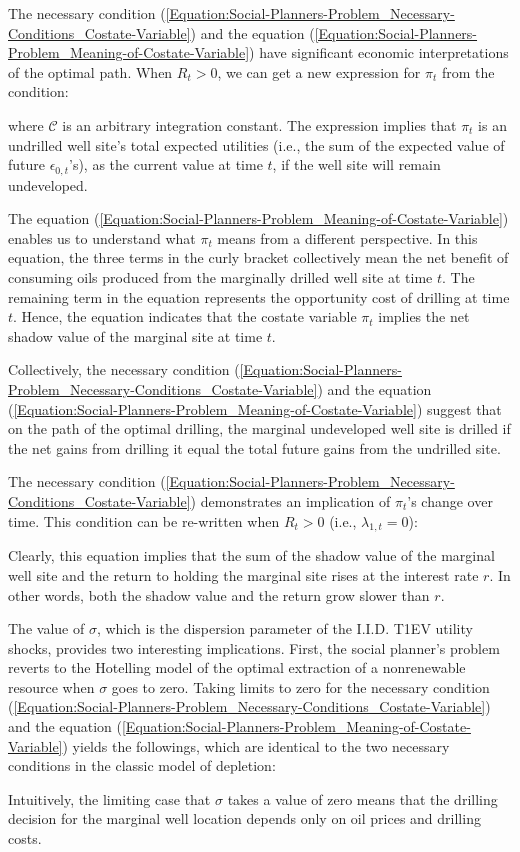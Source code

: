 The necessary condition (\ref{Equation:Social-Planners-Problem_Necessary-Conditions_Costate-Variable}) and the equation (\ref{Equation:Social-Planners-Problem_Meaning-of-Costate-Variable}) have significant economic interpretations of the optimal path. When $R_{t} > 0$, we can get a new expression for $\pi_{t}$ from the condition:

where $\mathcal{C}$ is an arbitrary integration constant. The expression implies that $\pi_{t}$ is an undrilled well site's total expected utilities (i.e., the sum of the expected value of future $\epsilon_{0, t}$'s), as the current value at time $t$, if the well site will remain undeveloped. 

The equation (\ref{Equation:Social-Planners-Problem_Meaning-of-Costate-Variable}) enables us to understand what $\pi_{t}$ means from a different perspective. 
In this equation, the three terms in the curly bracket collectively mean the net benefit of consuming oils produced from the marginally drilled well site at time $t$. The remaining term in the equation represents the opportunity cost of drilling at time $t$. Hence, the equation indicates that the costate variable $\pi_{t}$ implies the net shadow value of the marginal site at time $t$.

Collectively, the necessary condition (\ref{Equation:Social-Planners-Problem_Necessary-Conditions_Costate-Variable}) and the equation (\ref{Equation:Social-Planners-Problem_Meaning-of-Costate-Variable}) suggest that on the path of the optimal drilling, the marginal undeveloped well site is drilled if the net gains from drilling it equal the total future gains from the undrilled site. 

The necessary condition (\ref{Equation:Social-Planners-Problem_Necessary-Conditions_Costate-Variable}) demonstrates an implication of $\pi_{t}$'s change over time. This condition can be re-written when $R_{t} > 0$ (i.e., $\lambda_{1,t} = 0$):

Clearly, this equation implies that the sum of the shadow value of the marginal well site and the return to holding the marginal site rises at the interest rate $r$. In other words, both the shadow value and the return grow slower than $r$. 

The value of $\sigma$, which is the dispersion parameter of the I.I.D. T1EV utility shocks, provides two interesting implications. First, the social planner's problem reverts to the Hotelling model of the optimal extraction of a nonrenewable resource when $\sigma$ goes to zero. Taking limits to zero for the necessary condition (\ref{Equation:Social-Planners-Problem_Necessary-Conditions_Costate-Variable}) and the equation (\ref{Equation:Social-Planners-Problem_Meaning-of-Costate-Variable}) yields the followings, which are identical to the two necessary conditions in the classic model of depletion:

Intuitively, the limiting case that $\sigma$ takes a value of zero means that the drilling decision for the marginal well location depends only on oil prices and drilling costs. 

